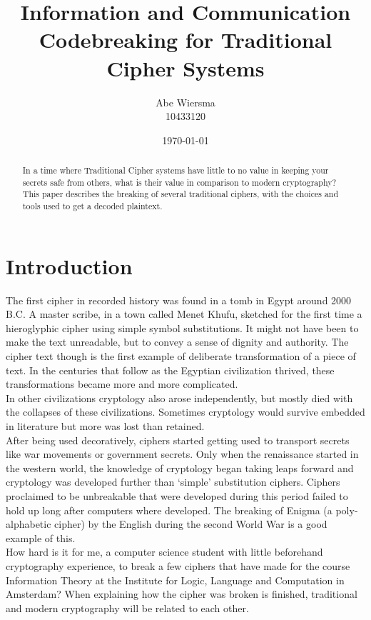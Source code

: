 \documentclass{uva-inf-bachelor-thesis}
\title{{\small Information and Communication}\\\textbf{Codebreaking for Traditional Cipher Systems}}
\author{Abe Wiersma\\{\small10433120}}
\date{\today}
\begin{document}
\maketitle

\begin{abstract}
In a time where Traditional Cipher systems have little to no value in keeping
your secrets safe from others, what is their value in comparison to modern
cryptography? This paper describes the breaking of several traditional ciphers,
with the choices and tools used to get a decoded plaintext.
\end{abstract}

\tableofcontents
\chapter{Introduction}
The first cipher in recorded history was found in a tomb in
Egypt\cite{kahn1996codebreakers} around 2000 B.C.
A master scribe, in a town called Menet Khufu,
sketched for the first time a hieroglyphic cipher using simple symbol
substitutions. It might not have been to make the text unreadable, but to convey
a sense of dignity and authority. The cipher text though is the first example of
deliberate transformation of a piece of text. In the centuries that follow as the
Egyptian civilization thrived, these transformations became more and more
complicated.\\

In other civilizations cryptology also arose independently, but mostly died
with the collapses of these civilizations. Sometimes cryptology would survive
embedded in literature but more was lost than retained.\\

After being used decoratively, ciphers started getting used to transport
secrets like war movements or government secrets. Only when the renaissance
started in the western world, the knowledge of
cryptology began taking leaps forward and cryptology was developed further
than `simple' substitution ciphers.
Ciphers proclaimed to be unbreakable that were developed during this period
failed to hold up long after computers where developed. The breaking of Enigma
(a poly-alphabetic cipher) by the English during the second World War is a good
example of this.\\

How hard is it for me, a computer science student with little
beforehand cryptography experience, to break a few ciphers that have made for
the course Information Theory at the Institute for Logic, Language and
Computation in Amsterdam?
When explaining how the cipher was broken is finished, traditional and modern
cryptography will be related to each other.
\end{document}

